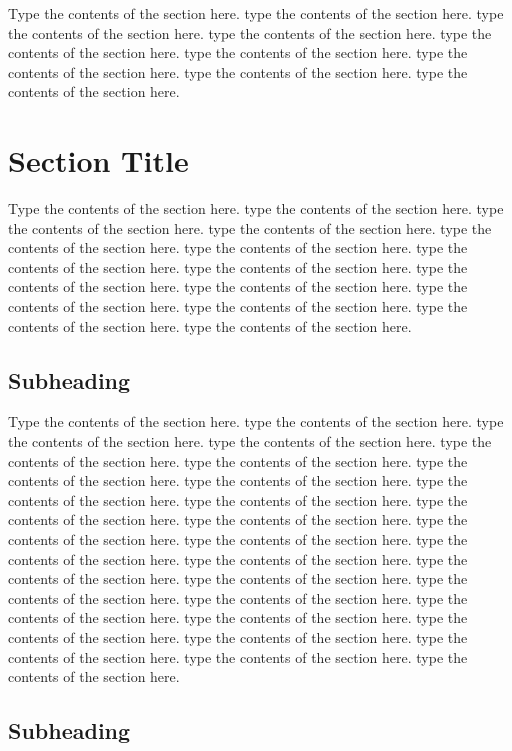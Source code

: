 \documentclass[twoside,twocolumn]{article}
\begin{document}
Type the contents of the section here.  type the contents of the section here.  type the contents of the section here.  type the contents of the section here.  type the contents of the section here.  type the contents of the section here.  type the contents of the section here.  type the contents of the section here.  type the contents of the section here.  

\section{Section Title}

Type the contents of the section here.  type the contents of the section here.  type the contents of the section here.  type the contents of the section here.  type the contents of the section here.  type the contents of the section here.  type the contents of the section here. type the contents of the section here.  type the contents of the section here.  type the contents of the section here.  type the contents of the section here.  type the contents of the section here.  type the contents of the section here.  type the contents of the section here. 

\subsection{Subheading}

Type the contents of the section here.  type the contents of the section here.  type the contents of the section here.  type the contents of the section here.  type the contents of the section here.  type the contents of the section here.  type the contents of the section here.  type the contents of the section here.  type the contents of the section here. type the contents of the section here.  type the contents of the section here.  type the contents of the section here.  type the contents of the section here.  type the contents of the section here.  type the contents of the section here.  type the contents of the section here.  type the contents of the section here.  type the contents of the section here.  type the contents of the section here.  type the contents of the section here.  type the contents of the section here. type the contents of the section here.  type the contents of the section here.  type the contents of the section here.  type the contents of the section here.  type the contents of the section here.  type the contents of the section here.

\subsection{Subheading}
\end{document}
